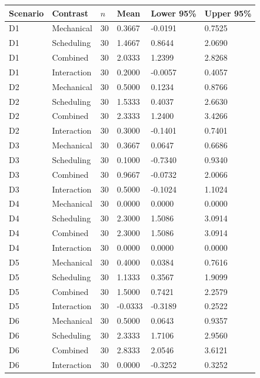 \begin{tabular}{llllll}
\toprule
Scenario & Contrast & $n$ & Mean & Lower 95\% & Upper 95\% \\
\midrule
D1 & Mechanical & 30 & 0.3667 & -0.0191 & 0.7525 \\
D1 & Scheduling & 30 & 1.4667 & 0.8644 & 2.0690 \\
D1 & Combined & 30 & 2.0333 & 1.2399 & 2.8268 \\
D1 & Interaction & 30 & 0.2000 & -0.0057 & 0.4057 \\
D2 & Mechanical & 30 & 0.5000 & 0.1234 & 0.8766 \\
D2 & Scheduling & 30 & 1.5333 & 0.4037 & 2.6630 \\
D2 & Combined & 30 & 2.3333 & 1.2400 & 3.4266 \\
D2 & Interaction & 30 & 0.3000 & -0.1401 & 0.7401 \\
D3 & Mechanical & 30 & 0.3667 & 0.0647 & 0.6686 \\
D3 & Scheduling & 30 & 0.1000 & -0.7340 & 0.9340 \\
D3 & Combined & 30 & 0.9667 & -0.0732 & 2.0066 \\
D3 & Interaction & 30 & 0.5000 & -0.1024 & 1.1024 \\
D4 & Mechanical & 30 & 0.0000 & 0.0000 & 0.0000 \\
D4 & Scheduling & 30 & 2.3000 & 1.5086 & 3.0914 \\
D4 & Combined & 30 & 2.3000 & 1.5086 & 3.0914 \\
D4 & Interaction & 30 & 0.0000 & 0.0000 & 0.0000 \\
D5 & Mechanical & 30 & 0.4000 & 0.0384 & 0.7616 \\
D5 & Scheduling & 30 & 1.1333 & 0.3567 & 1.9099 \\
D5 & Combined & 30 & 1.5000 & 0.7421 & 2.2579 \\
D5 & Interaction & 30 & -0.0333 & -0.3189 & 0.2522 \\
D6 & Mechanical & 30 & 0.5000 & 0.0643 & 0.9357 \\
D6 & Scheduling & 30 & 2.3333 & 1.7106 & 2.9560 \\
D6 & Combined & 30 & 2.8333 & 2.0546 & 3.6121 \\
D6 & Interaction & 30 & 0.0000 & -0.3252 & 0.3252 \\
\bottomrule
\end{tabular}
